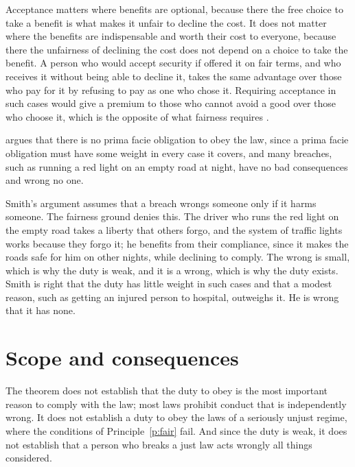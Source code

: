 \documentclass{situationist-preprint}
\begin{document}
\begin{reply}
Acceptance matters where benefits are optional, because there the free choice to take a benefit is what makes it unfair to decline the cost. It does not matter where the benefits are indispensable and worth their cost to everyone, because there the unfairness of declining the cost does not depend on a choice to take the benefit. A person who would accept security if offered it on fair terms, and who receives it without being able to decline it, takes the same advantage over those who pay for it by refusing to pay as one who chose it. Requiring acceptance in such cases would give a premium to those who cannot avoid a good over those who choose it, which is the opposite of what fairness requires \citep{Arneson1982}.
\end{reply}

\begin{objection}
\citet{Smith1973} argues that there is no prima facie obligation to obey the law, since a prima facie obligation must have some weight in every case it covers, and many breaches, such as running a red light on an empty road at night, have no bad consequences and wrong no one.
\end{objection}

\begin{reply}
Smith's argument assumes that a breach wrongs someone only if it harms someone. The fairness ground denies this. The driver who runs the red light on the empty road takes a liberty that others forgo, and the system of traffic lights works because they forgo it; he benefits from their compliance, since it makes the roads safe for him on other nights, while declining to comply. The wrong is small, which is why the duty is weak, and it is a wrong, which is why the duty exists. Smith is right that the duty has little weight in such cases and that a modest reason, such as getting an injured person to hospital, outweighs it. He is wrong that it has none.
\end{reply}

\section{Scope and consequences}

The theorem does not establish that the duty to obey is the most important reason to comply with the law; most laws prohibit conduct that is independently wrong. It does not establish a duty to obey the laws of a seriously unjust regime, where the conditions of Principle~\ref{p:fair} fail. And since the duty is weak, it does not establish that a person who breaks a just law acts wrongly all things considered.
\end{document}
